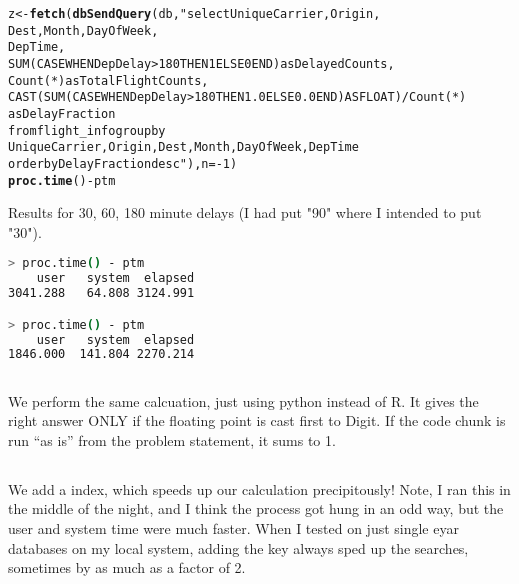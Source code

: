 \documentclass{article}\usepackage[]{graphicx}\usepackage[]{color}
\makeatletter
\newcommand{\hlnum}[1]{\textcolor[rgb]{0.686,0.059,0.569}{#1}}%
\newcommand{\hlstr}[1]{\textcolor[rgb]{0.192,0.494,0.8}{#1}}%
\newcommand{\hlopt}[1]{\textcolor[rgb]{0,0,0}{#1}}%
\newcommand{\hlstd}[1]{\textcolor[rgb]{0.345,0.345,0.345}{#1}}%
\newcommand{\hlkwb}[1]{\textcolor[rgb]{0.69,0.353,0.396}{#1}}%
\newcommand{\hlkwc}[1]{\textcolor[rgb]{0.333,0.667,0.333}{#1}}%
\newcommand{\hlkwd}[1]{\textcolor[rgb]{0.737,0.353,0.396}{\textbf{#1}}}%
\newenvironment{kframe}{%
 \def\at@end@of@kframe{}%
 \ifinner\ifhmode%
  \def\at@end@of@kframe{\end{minipage}}%
  \begin{minipage}{\columnwidth}%
 \fi\fi%
 \def\FrameCommand##1{\hskip\@totalleftmargin \hskip-\fboxsep
 \colorbox{shadecolor}{##1}\hskip-\fboxsep
     \hskip-\linewidth \hskip-\@totalleftmargin \hskip\columnwidth}%
 \MakeFramed {\advance\hsize-\width
   \@totalleftmargin\z@ \linewidth\hsize
   \@setminipage}}%
 {\par\unskip\endMakeFramed%
 \at@end@of@kframe}
\newenvironment{knitrout}{}{} %
\makeatother
\begin{document}
\begin{knitrout}
\begin{kframe}
\begin{alltt}
\hlstd{z} \hlkwb{<-} \hlkwd{fetch}\hlstd{(}\hlkwd{dbSendQuery}\hlstd{(db,} \hlstr{"select UniqueCarrier, Origin, 
                       Dest, Month, DayOfWeek, 
                       DepTime,
                       SUM(CASE WHEN DepDelay > 180 THEN 1 ELSE 0 END) as DelayedCounts, 
                       Count(*) as TotalFlightCounts,
                       CAST(SUM(CASE WHEN DepDelay > 180 THEN 1.0 ELSE 0.0 END) AS FLOAT) / Count(*) 
                       as DelayFraction
                       from flight_info group by
                       UniqueCarrier, Origin, Dest, Month, DayOfWeek, DepTime
                       order by DelayFraction desc"}\hlstd{),}\hlkwc{n}\hlstd{=}\hlopt{-}\hlnum{1}\hlstd{)}
\hlkwd{proc.time}\hlstd{()} \hlopt{-} \hlstd{ptm}
\end{alltt}
\end{kframe}
\end{knitrout}

Results for 30, 60, 180 minute delays (I had put "90" where I intended to put "30").

\begin{lstlisting}[language=bash,caption={Timing for the loading, initial (non-indexed) query}]
> proc.time() - ptm
    user   system  elapsed 
3041.288   64.808 3124.991

> proc.time() - ptm
    user   system  elapsed 
1846.000  141.804 2270.214

\end{lstlisting}

\subsection{}

We perform the same calcuation, just using python instead of R.  It gives the right answer ONLY if the floating point is cast first to Digit.  If the code chunk is run ``as is'' from the problem statement, it sums to 1.

\subsection{}

We add a index, which speeds up our calculation precipitously!  Note, I ran this in the middle of the night, and I think the process got hung in an odd way, but the user and system time were much faster.  When I tested on just single eyar databases on my local system, adding the key always sped up the searches, sometimes by as much as a factor of 2.
\end{document}
